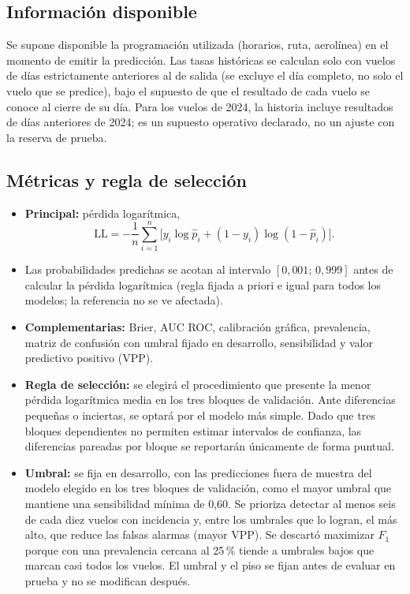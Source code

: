 \documentclass[11pt,a4paper]{article}
\begin{document}
\subsection{Información disponible}
Se supone disponible la programación utilizada (horarios, ruta, aerolínea) en el momento de emitir la predicción. Las tasas históricas se calculan solo con vuelos de días estrictamente anteriores al de salida (se excluye el día completo, no solo el vuelo que se predice), bajo el supuesto de que el resultado de cada vuelo se conoce al cierre de su día. Para los vuelos de 2024, la historia incluye resultados de días anteriores de 2024; es un supuesto operativo declarado, no un ajuste con la reserva de prueba.
 
\subsection{Métricas y regla de selección}
\begin{itemize}[leftmargin=*]
  \item \textbf{Principal:} pérdida logarítmica,
  \[
    \mathrm{LL} = -\frac{1}{n}\sum_{i=1}^{n}\bigl[y_i\log \hat p_i + (1-y_i)\log(1-\hat p_i)\bigr].
  \]
  \item Las probabilidades predichas se acotan al intervalo $[0{,}001;\,0{,}999]$ antes de calcular la pérdida logarítmica (regla fijada a priori e igual para todos los modelos; la referencia no se ve afectada).
  \item \textbf{Complementarias:} Brier, AUC ROC, calibración gráfica, prevalencia, matriz de confusión con umbral fijado en desarrollo, sensibilidad y valor predictivo positivo (VPP).
  \item \textbf{Regla de selección:} se elegirá el procedimiento que presente la menor pérdida logarítmica media en los tres bloques de validación. Ante diferencias pequeñas o inciertas, se optará por el modelo más simple. Dado que tres bloques dependientes no permiten estimar intervalos de confianza, las diferencias pareadas por bloque se reportarán únicamente de forma puntual.
  \item \textbf{Umbral:} se fija en desarrollo, con las predicciones fuera de muestra del modelo elegido en los tres bloques de validación, como el mayor umbral que mantiene una sensibilidad mínima de 0,60. Se prioriza detectar al menos seis de cada diez vuelos con incidencia y, entre los umbrales que lo logran, el más alto, que reduce las falsas alarmas (mayor VPP). Se descartó maximizar $F_1$ porque con una prevalencia cercana al 25\,\% tiende a umbrales bajos que marcan casi todos los vuelos. El umbral y el piso se fijan antes de evaluar en prueba y no se modifican después.
\end{itemize}
 
\end{document}
